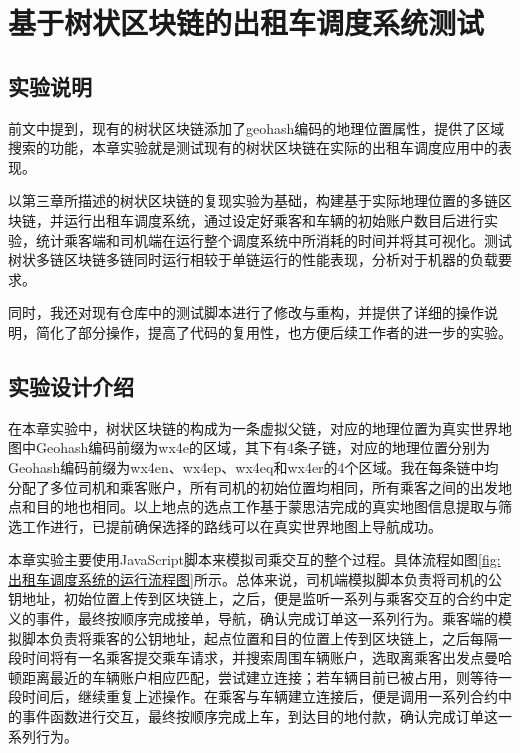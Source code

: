 
\chapter{基于树状区块链的出租车调度系统测试}

\section{实验说明}

前文中提到，现有的树状区块链添加了geohash编码的地理位置属性，提供了区域搜索的功能，本章实验就是测试现有的树状区块链在实际的出租车调度应用中的表现。

以第三章所描述的树状区块链的复现实验为基础，构建基于实际地理位置的多链区块链，并运行出租车调度系统，通过设定好乘客和车辆的初始账户数目后进行实验，统计乘客端和司机端在运行整个调度系统中所消耗的时间并将其可视化。测试树状多链区块链多链同时运行相较于单链运行的性能表现，分析对于机器的负载要求。

同时，我还对现有仓库中的测试脚本进行了修改与重构，并提供了详细的操作说明，简化了部分操作，提高了代码的复用性，也方便后续工作者的进一步的实验。

\section{实验设计介绍}

在本章实验中，树状区块链的构成为一条虚拟父链，对应的地理位置为真实世界地图中Geohash编码前缀为wx4e的区域，其下有4条子链，对应的地理位置分别为Geohash编码前缀为wx4en、wx4ep、wx4eq和wx4er的4个区域。我在每条链中均分配了多位司机和乘客账户，所有司机的初始位置均相同，所有乘客之间的出发地点和目的地也相同。以上地点的选点工作基于蒙思洁完成的真实地图信息提取与筛选工作进行，已提前确保选择的路线可以在真实世界地图上导航成功。

本章实验主要使用JavaScript脚本来模拟司乘交互的整个过程。具体流程如图\ref{fig:出租车调度系统的运行流程图}所示。总体来说，司机端模拟脚本负责将司机的公钥地址，初始位置上传到区块链上，之后，便是监听一系列与乘客交互的合约中定义的事件，最终按顺序完成接单，导航，确认完成订单这一系列行为。乘客端的模拟脚本负责将乘客的公钥地址，起点位置和目的位置上传到区块链上，之后每隔一段时间将有一名乘客提交乘车请求，并搜索周围车辆账户，选取离乘客出发点曼哈顿距离最近的车辆账户相应匹配，尝试建立连接；若车辆目前已被占用，则等待一段时间后，继续重复上述操作。在乘客与车辆建立连接后，便是调用一系列合约中的事件函数进行交互，最终按顺序完成上车，到达目的地付款，确认完成订单这一系列行为。

